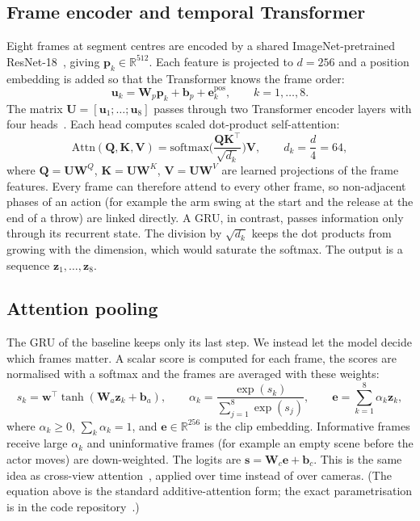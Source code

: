 \documentclass[runningheads]{llncs}
\begin{document}
\subsection{Frame encoder and temporal Transformer}
Eight frames at segment centres are encoded by a shared ImageNet-pretrained ResNet-18~\cite{he2016}, giving $\mathbf p_k\in\mathbb R^{512}$. Each feature is projected to $d=256$ and a position embedding is added so that the Transformer knows the frame order:
\begin{equation}
\mathbf u_k=\mathbf W_p\mathbf p_k+\mathbf b_p+\mathbf e^{\mathrm{pos}}_k,\qquad k=1,\dots,8.
\end{equation}
The matrix $\mathbf U=[\mathbf u_1;\dots;\mathbf u_8]$ passes through two Transformer encoder layers with four heads~\cite{vaswani2017}. Each head computes scaled dot-product self-attention:
\begin{equation}
\mathrm{Attn}(\mathbf Q,\mathbf K,\mathbf V)=\mathrm{softmax}\!\Big(\frac{\mathbf Q\mathbf K^{\top}}{\sqrt{d_k}}\Big)\mathbf V,\qquad d_k=\frac{d}{4}=64,
\end{equation}
where $\mathbf Q=\mathbf U\mathbf W^Q$, $\mathbf K=\mathbf U\mathbf W^K$, $\mathbf V=\mathbf U\mathbf W^V$ are learned projections of the frame features. Every frame can therefore attend to every other frame, so non-adjacent phases of an action (for example the arm swing at the start and the release at the end of a throw) are linked directly. A GRU, in contrast, passes information only through its recurrent state. The division by $\sqrt{d_k}$ keeps the dot products from growing with the dimension, which would saturate the softmax. The output is a sequence $\mathbf z_1,\dots,\mathbf z_8$.

\subsection{Attention pooling}
The GRU of the baseline keeps only its last step. We instead let the model decide which frames matter. A scalar score is computed for each frame, the scores are normalised with a softmax and the frames are averaged with these weights:
\begin{equation}
s_k=\mathbf w^{\top}\tanh(\mathbf W_a\mathbf z_k+\mathbf b_a),\qquad
\alpha_k=\frac{\exp(s_k)}{\sum_{j=1}^{8}\exp(s_j)},\qquad
\mathbf e=\sum_{k=1}^{8}\alpha_k\mathbf z_k,
\end{equation}
where $\alpha_k\ge0$, $\sum_k\alpha_k=1$, and $\mathbf e\in\mathbb R^{256}$ is the clip embedding. Informative frames receive large $\alpha_k$ and uninformative frames (for example an empty scene before the actor moves) are down-weighted. The logits are $\mathbf s=\mathbf W_c\mathbf e+\mathbf b_c$. This is the same idea as cross-view attention~\cite{nguyen2021}, applied over time instead of over cameras. (The equation above is the standard additive-attention form; the exact parametrisation is in the code repository~\cite{ivprepo}.)
\end{document}
